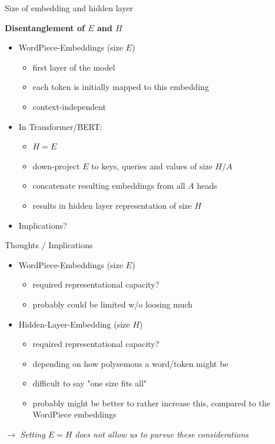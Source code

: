 \begin{frame}{Size of embedding and hidden layer}

\vfill

	\textbf{Disentanglement of $E$ and $H$}

	\begin{itemize}
		\item	WordPiece-Embeddings (size $E$) 
			\begin{itemize}
				\item first layer of the model
				\item each token is initially mapped to this embedding
				\item context-independent
			\end{itemize}
		\item In Transformer/BERT: 
			\begin{itemize}
				\item $H = E$
				\item down-project $E$ to keys, queries and values of size $H/A$
				\item concatenate resulting embeddings from all $A$ heads
				\item results in hidden layer representation of size $H$
			\end{itemize}
		\item Implications?
	\end{itemize}

\vfill

\end{frame}


\begin{frame}{Thoughts / Implications}

\vfill

	\begin{itemize}
		\item	WordPiece-Embeddings (size $E$) 
			\begin{itemize}
				\item required representational capacity?
				\item probably could be limited w/o loosing much
			\end{itemize}
		\item Hidden-Layer-Embedding (size $H$)
			\begin{itemize}
				\item required representational capacity?
				\item depending on how polysemous a word/token might be
				\item difficult to say "one size fits all"
				\item probably might be better to rather increase this, compared to the WordPiece embeddings
			\end{itemize}
	\end{itemize}
	
\vspace{.5cm}

$\to$ \textit{Setting $E = H$ does not allow us to pursue these considerations}

\vfill

\end{frame}


